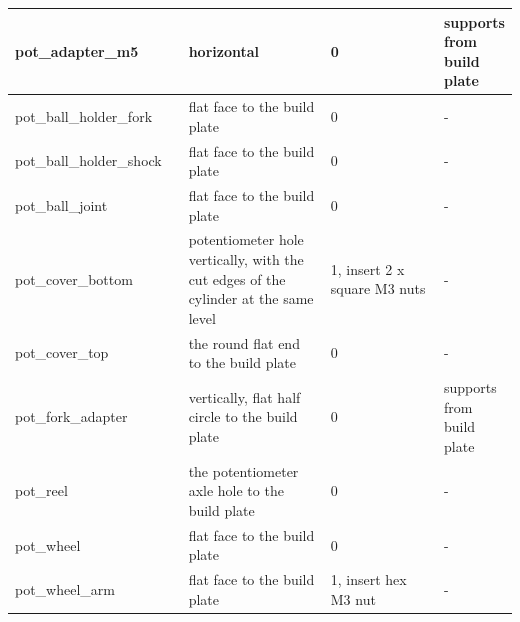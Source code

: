 \documentclass[a4paper,11pt]{article} %
\begin{document}
\begin{longtable}{ |p{0.35\linewidth} | p{0.3\linewidth}| p{0.25\linewidth}| p{0.15\linewidth}|}
     \hline
     pot\_adapter\_m5 &	horizontal &	0 &	supports from build plate\\
     \hline
     pot\_ball\_holder\_fork &	flat face to the build plate & 0 &	-\\
     \hline
     pot\_ball\_holder\_shock &	flat face to the build plate &	0 &	-\\
     \hline
     pot\_ball\_joint &	flat face to the build plate &	0 &	-\\
     \hline
     pot\_cover\_bottom &	potentiometer hole vertically, with the cut edges of the cylinder at the same level &	1, insert 2 x square M3 nuts &	-\\
     \hline
     pot\_cover\_top &	the round flat end to the build plate &	0 &	-\\
     \hline
     pot\_fork\_adapter &	vertically, flat half circle to the build plate &	0 &	supports from build plate\\
     \hline
     pot\_reel	& the potentiometer axle hole to the build plate &	0 &	-\\
     \hline
     pot\_wheel &	flat face to the build plate &	0 &	-\\
     \hline
      pot\_wheel\_arm &	flat face to the build plate &	1, insert hex M3 nut & -\\
     \hline
\end{longtable}
\end{document}
